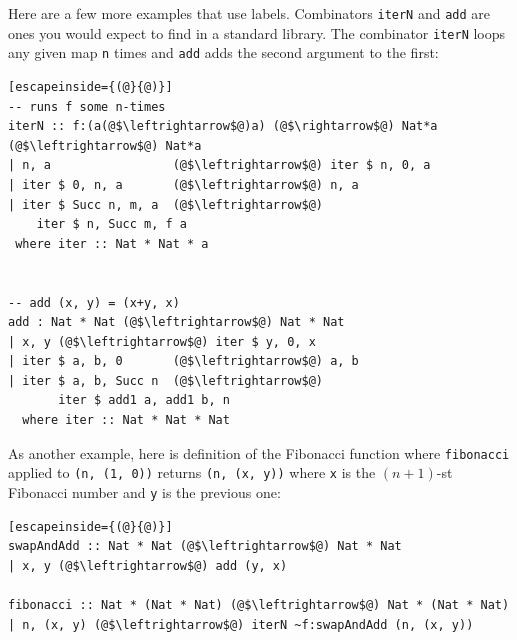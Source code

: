 \documentclass{article}
\newcommand{\ctr}[1]{{\scriptsize{\texttt{#1}}}}
\begin{document}
Here are a few more examples that use labels.  Combinators \ctr{iterN} and
\ctr{add} are ones you would expect to find in a standard library. The
combinator \ctr{iterN} loops any given map \ctr{n} times and \ctr{add} adds
the second argument to the first:
\vspace{-10pt}
\begin{multicols}{2}
\begin{lstlisting}[escapeinside={(@}{@)}]
-- runs f some n-times
iterN :: f:(a(@$\leftrightarrow$@)a) (@$\rightarrow$@) Nat*a (@$\leftrightarrow$@) Nat*a
| n, a                 (@$\leftrightarrow$@) iter $ n, 0, a
| iter $ 0, n, a       (@$\leftrightarrow$@) n, a
| iter $ Succ n, m, a  (@$\leftrightarrow$@)
    iter $ n, Succ m, f a
 where iter :: Nat * Nat * a


-- add (x, y) = (x+y, x)
add : Nat * Nat (@$\leftrightarrow$@) Nat * Nat
| x, y (@$\leftrightarrow$@) iter $ y, 0, x
| iter $ a, b, 0       (@$\leftrightarrow$@) a, b
| iter $ a, b, Succ n  (@$\leftrightarrow$@)
       iter $ add1 a, add1 b, n
  where iter :: Nat * Nat * Nat
 \end{lstlisting}
\end{multicols}

\vspace{-20pt} As another example, here is definition of the Fibonacci
function where \ctr{fibonacci} applied to \lstinline{(n, (1, 0))} returns
\lstinline{(n, (x, y))} where \ctr{x} is the $(n+1)$-st Fibonacci number and
\ctr{y} is the previous one:

\begin{lstlisting}[escapeinside={(@}{@)}]
swapAndAdd :: Nat * Nat (@$\leftrightarrow$@) Nat * Nat
| x, y (@$\leftrightarrow$@) add (y, x)

fibonacci :: Nat * (Nat * Nat) (@$\leftrightarrow$@) Nat * (Nat * Nat)
| n, (x, y) (@$\leftrightarrow$@) iterN ~f:swapAndAdd (n, (x, y))
 \end{lstlisting}
\end{document}
